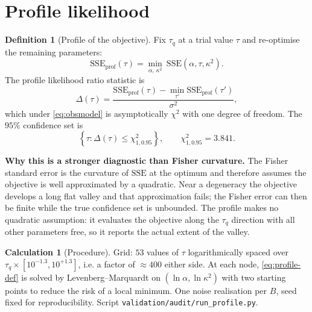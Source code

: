 \documentclass[11pt,a4paper]{article}
\theoremstyle{definition}
\newtheorem{definitionx}{Definition}[section]
\newtheorem{calculationx}{Calculation}[section]
\newcommand{\tq}{\tau_{q}}
\newcommand{\kk}{\kappa^{2}}
\newcommand{\Bnum}{B}
\begin{document}
\section{Profile likelihood}
\label{sec:profile}

\begin{definitionx}[Profile of the objective]
\label{def:profile}
Fix $\tq$ at a trial value $\tau$ and re-optimise the remaining parameters:
\begin{equation}
  \mathrm{SSE}_{\text{prof}}(\tau)
   = \min_{\alpha,\ \kk}\ \mathrm{SSE}(\alpha,\tau,\kk) .
  \label{eq:profile-def}
\end{equation}
The profile likelihood ratio statistic is
\begin{equation}
  \Delta(\tau)
   = \frac{\mathrm{SSE}_{\text{prof}}(\tau)
           - \min_{\tau'}\mathrm{SSE}_{\text{prof}}(\tau')}{\sigma^{2}} ,
  \label{eq:profile-stat}
\end{equation}
which under \eqref{eq:obsmodel} is asymptotically $\chi^{2}$ with one degree of
freedom. The $95\%$ confidence set is
\begin{equation}
  \left\{\tau : \Delta(\tau) \leq \chi^{2}_{1,0.95}\right\},
  \qquad \chi^{2}_{1,0.95} = 3.841 .
  \label{eq:profile-threshold}
\end{equation}
\end{definitionx}

\textbf{Why this is a stronger diagnostic than Fisher curvature.} The Fisher
standard error is the curvature of $\mathrm{SSE}$ at the optimum and therefore
assumes the objective is well approximated by a quadratic. Near a degeneracy
the objective develops a long flat valley and that approximation fails; the
Fisher error can then be finite while the true confidence set is unbounded.
The profile makes no quadratic assumption: it evaluates the objective along the
$\tq$ direction with all other parameters free, so it reports the actual extent
of the valley.

\begin{calculationx}[Procedure]
\label{calc:profile}
Grid: $53$ values of $\tau$ logarithmically spaced over
$\tq\times[10^{-1.3},10^{+1.3}]$, i.e. a factor of $\approx400$ either side.
At each node, \eqref{eq:profile-def} is solved by Levenberg--Marquardt on
$(\ln\alpha,\ln\kk)$ with two starting points to reduce the risk of a local
minimum. One noise realisation per $\Bnum$, seed fixed for reproducibility.
Script \texttt{validation/audit/run\_profile.py}.
\end{calculationx}
\end{document}
